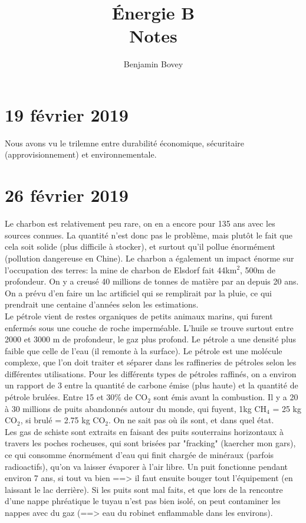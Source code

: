 \documentclass{article}
\title{Énergie B \\ Notes}
\author{Benjamin Bovey}
\begin{document}
\maketitle


\section{19 février 2019}
Nous avons vu le trilemne entre durabilité économique, sécuritaire (approvisionnement) et environnementale.

\section{26 février 2019}
Le charbon est relativement peu rare, on en a encore pour 135 ans avec les sources connues. La quantité n'est donc pas le problème, mais plutôt le fait que cela soit solide (plus difficile à stocker), et surtout qu'il pollue énormément (pollution dangereuse en Chine). Le charbon a également un impact énorme sur l'occupation des terres: la mine de charbon de Elsdorf fait 44km$^2$, 500m de profondeur. On y a creusé 40 millions de tonnes de matière par an depuis 20 ans. On a prévu d'en faire un lac artificiel qui se remplirait par la pluie, ce qui prendrait une centaine d'années selon les estimations. \\

 Le pétrole vient de restes organiques de petits animaux marins, qui furent enfermés sous une couche de roche imperméable. L'huile se trouve surtout entre 2000 et 3000 m de profondeur, le gaz plus profond. Le pétrole a une densité plus faible que celle de l'eau (il remonte à la surface). Le pétrole est une molécule complexe, que l'on doit traiter et séparer dans les raffineries de pétroles selon les différentes utilisations. Pour les différents types de pétroles raffinés, on a environ un rapport de 3 entre la quantité de carbone émise (plus haute) et la quantité de pétrole brulées. Entre 15 et 30\% de CO$_2$ sont émis avant la combustion. Il y a 20 à 30 millions de puits abandonnés autour du monde, qui fuyent, 1kg CH$_4$ = 25 kg CO$_2$, si brulé = 2.75 kg CO$_2$. On ne sait pas où ils sont, et dans quel état. \\

 Les gas de schiste sont extraits en faisant des puits souterrains horizontaux à travers les poches rocheuses, qui sont brisées par "fracking" (kaercher mon gars), ce qui consomme énormément d'eau qui finit chargée de minéraux (parfois radioactifs), qu'on va laisser évaporer à l'air libre. Un puit fonctionne pendant environ 7 ans, si tout va bien ==> il faut ensuite bouger tout l'équipement (en laissant le lac derrière). Si les puits sont mal faits, et que lors de la rencontre d'une nappe phréatique le tuyau n'est pas bien isolé, on peut contaminer les nappes avec du gaz (==> eau du robinet enflammable dans les environs). \\
\end{document}
